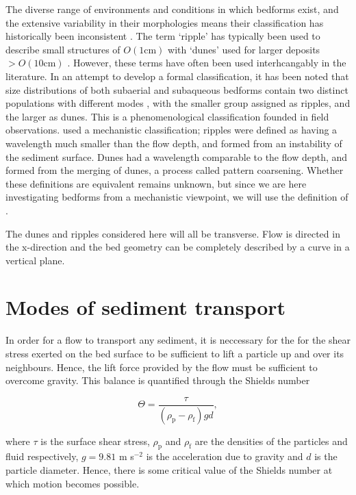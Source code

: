 \documentclass[12pt]{article}
\begin{document}
The diverse range of environments and conditions in which bedforms exist, and the extensive variability in their morphologies means their classification has historically been inconsistent \citep{Ashley90}. The term `ripple' has typically been used to describe small structures of $O(1 \text{cm})$ with `dunes' used for larger deposits $ > O(10 \text{cm})$ \citep{Julien95}. However, these terms have often been used interhcangably in the literature. In an attempt to develop a formal classification, it has been noted that size distributions of both subaerial and subaqueous bedforms contain two distinct populations with different modes \citep{Lancaster88, Ashley90}, with the smaller group assigned as ripples, and the larger as dunes. This is a phenomenological classification founded in field observations. \citet{Andreotti12} used a mechanistic classification; ripples were defined as having a wavelength much smaller than the flow depth, and formed from an instability of the sediment surface. Dunes had a wavelength comparable to the flow depth, and formed from the merging of dunes, a process called pattern coarsening. Whether these definitions are equivalent remains unknown, but since we are here investigating bedforms from a mechanistic viewpoint, we will use the definition of \citet{Andreotti12}.

The dunes and ripples considered here will all be transverse. Flow is directed in the x-direction and the bed geometry can be completely described by a curve in a vertical plane. 

\section{Modes of sediment transport}
\label{sec:sed_trans}

In order for a flow to transport any sediment, it is neccessary for the for the shear stress exerted on the bed surface to be sufficient to lift a particle up and over its neighbours. Hence, the lift force provided by the flow must be sufficient to overcome gravity. This balance is quantified through the Shields number

\begin{equation}
\label{equ:Shields}
\Theta = \frac{\tau}{(\rho_{\text{p}} - \rho_{\text{f}}) g d},
\end{equation}

where $\tau$ is the surface shear stress, $\rho_{\text{p}}$ and $\rho_{\text{f}}$ are the densities of the particles and fluid respectively, $g = 9.81$ m s$^{-2}$ is the acceleration due to gravity and $d$ is the particle diameter. Hence, there is some critical value of the Shields number at which motion becomes possible. 
\end{document}
